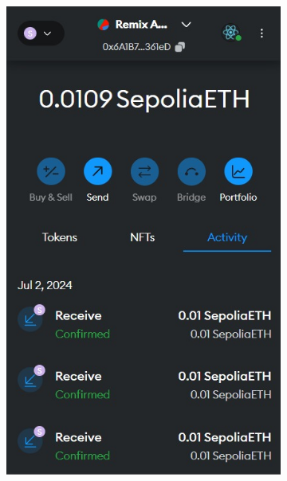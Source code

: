 \begin{itemize}
    \begin{figure} [H] \centering
      \centering
      \begin{subfigure}{0.45\textwidth}
          \includegraphics[scale=0.32]{gambar/sepolia_akun.jpg}
          \caption{}
          \label{fig:sepolia}
      \end{subfigure}
      \hspace{5pt}
      \begin{subfigure}{0.45\textwidth}

\end{subfigure}
\end{figure}
\end{itemize}
